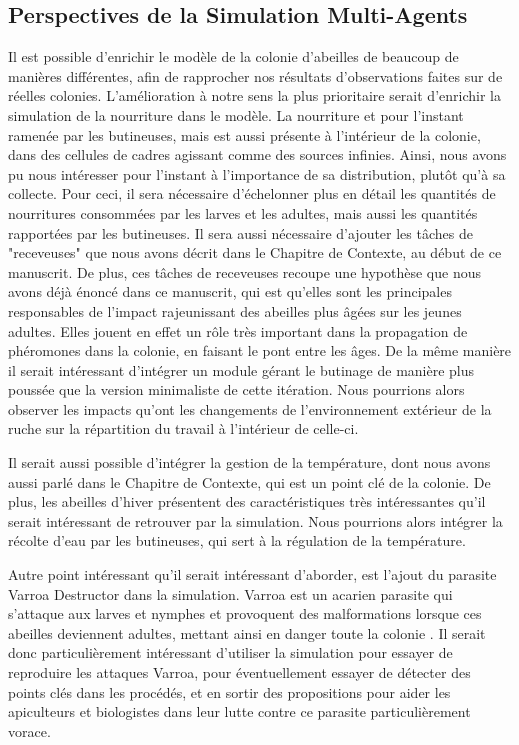 	\subsection{Perspectives de la Simulation Multi-Agents}
	Il est possible d'enrichir le modèle de la colonie d'abeilles de beaucoup de manières différentes, afin de rapprocher nos résultats d'observations faites sur de réelles colonies. L'amélioration à notre sens la plus prioritaire serait d'enrichir la simulation de la nourriture dans le modèle. La nourriture et pour l'instant ramenée par les butineuses, mais est aussi présente à l'intérieur de la colonie, dans des cellules de cadres agissant comme des sources infinies. Ainsi, nous avons pu nous intéresser pour l'instant à l'importance de sa distribution, plutôt qu'à sa collecte. Pour ceci, il sera nécessaire d'échelonner plus en détail les quantités de nourritures consommées par les larves et les adultes, mais aussi les quantités rapportées par les butineuses. Il sera aussi nécessaire d'ajouter les tâches de "receveuses" que nous avons décrit dans le Chapitre de Contexte, au début de ce manuscrit. De plus, ces tâches de receveuses recoupe une hypothèse que nous avons déjà énoncé dans ce manuscrit, qui est qu'elles sont les principales responsables de l'impact rajeunissant des abeilles plus âgées sur les jeunes adultes. Elles jouent en effet un rôle très important dans la propagation de phéromones dans la colonie, en faisant le pont entre les âges. De la même manière il serait intéressant d'intégrer un module gérant le butinage de manière plus poussée que la version minimaliste de cette itération. Nous pourrions alors observer les impacts qu'ont les changements de l'environnement extérieur de la ruche sur la répartition du travail à l'intérieur de celle-ci.
	
	Il serait aussi possible d'intégrer la gestion de la température, dont nous avons aussi parlé dans le Chapitre de Contexte, qui est un point clé de la colonie. De plus, les abeilles d'hiver présentent des caractéristiques très intéressantes qu'il serait intéressant de retrouver par la simulation. Nous pourrions alors intégrer la récolte d'eau par les butineuses, qui sert à la régulation de la température.
	
	Autre point intéressant qu'il serait intéressant d'aborder, est l'ajout du parasite Varroa Destructor dans la simulation. Varroa est un acarien parasite qui s'attaque aux larves et nymphes et provoquent des malformations lorsque ces abeilles deviennent adultes, mettant ainsi en danger toute la colonie \cite{le_conte_varroa_2010}. Il serait donc particulièrement intéressant d'utiliser la simulation pour essayer de reproduire les attaques Varroa, pour éventuellement essayer de détecter des points clés dans les procédés, et en sortir des propositions pour aider les apiculteurs et biologistes dans leur lutte contre ce parasite particulièrement vorace.
	
